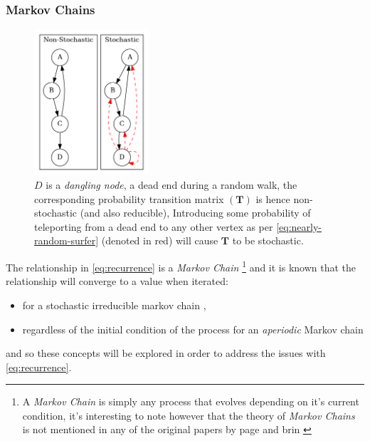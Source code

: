 \documentclass[11pt]{report}
\begin{document}
\subsubsection{Markov Chains}
\label{markov}

\begin{figure}
    \includegraphics[width=0.38\textwidth]{media/dot/stochastic_graph_example.dot.png}
    \caption{\label{fig:stochastic-example}\(D\) is a \emph{dangling node}, a dead end during a random walk, the corresponding probability transition matrix \((\mathbf{T})\) is hence non-stochastic (and also reducible), Introducing some probability of teleporting from a dead end to any other vertex as per \eqref{eq:nearly-random-surfer} (denoted in red) will cause \(\mathbf{T}\) to be stochastic.}
\end{figure}

The relationship in \eqref{eq:recurrence} is a \emph{Markov Chain} \footnote{A \emph{Markov Chain} is
simply any process that evolves depending on it's current condition, it's
interesting to note however that the theory of \emph{Markov Chains} is not mentioned in any
of the original papers by page and brin
\cite[]{langvilleGooglePageRankScience2012}}  and it is known
that the relationship will converge to a value when iterated:

\begin{itemize}
\item for a stochastic irreducible markov chain \cite[.5]{larsonElementaryLinearAlgebra1991},
\item regardless of the initial condition of the process for an \emph{aperiodic} Markov chain \cite[]{langvilleGooglePageRankScience2012}
\end{itemize}

and so these concepts will be explored in order to address the issues with \eqref{eq:recurrence}.
\end{document}
